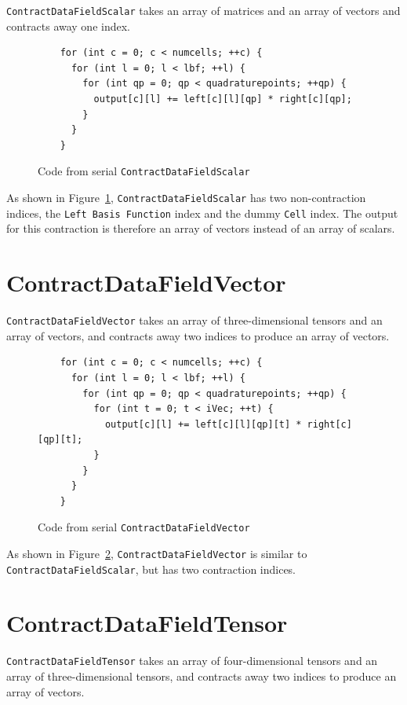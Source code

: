 \texttt{ContractDataFieldScalar} takes an array of matrices and an array of
vectors and contracts away one index.

\begin{figure}[ht]
    \begin{lstlisting}
    for (int c = 0; c < numcells; ++c) {
      for (int l = 0; l < lbf; ++l) {
        for (int qp = 0; qp < quadraturepoints; ++qp) {
          output[c][l] += left[c][l][qp] * right[c][qp];
        }
      }
    }
    \end{lstlisting}
\caption{Code from serial \texttt{ContractDataFieldScalar}
\label{lst:ContractDataFieldScalarSerial}} 
\end{figure}

As shown in Figure~\ref{lst:ContractDataFieldScalarSerial},
\texttt{ContractDataFieldScalar} has two non-contraction indices, the
\texttt{Left Basis Function} index and the dummy \texttt{Cell} index. The
output for this contraction is therefore an array of vectors instead of an array
of scalars.

\section{ContractDataFieldVector}
\texttt{ContractDataFieldVector} takes an array of three-dimensional tensors and
an array of vectors, and contracts away two indices to produce an array of
vectors.

\begin{figure}[ht]
    \begin{lstlisting}
    for (int c = 0; c < numcells; ++c) {
      for (int l = 0; l < lbf; ++l) {
        for (int qp = 0; qp < quadraturepoints; ++qp) {
          for (int t = 0; t < iVec; ++t) {
            output[c][l] += left[c][l][qp][t] * right[c][qp][t];
          }
        }
      }
    }
    \end{lstlisting}
\caption{Code from serial \texttt{ContractDataFieldVector}
\label{lst:ContractDataFieldVectorSerial}} 
\end{figure}

As shown in Figure~\ref{lst:ContractDataFieldVectorSerial},
\texttt{ContractDataFieldVector} is similar to \texttt{ContractDataFieldScalar},
but has two contraction indices. 

\section{ContractDataFieldTensor}
\texttt{ContractDataFieldTensor} takes an array of four-dimensional tensors and
an array of three-dimensional tensors, and contracts away two indices to produce
an array of vectors.

